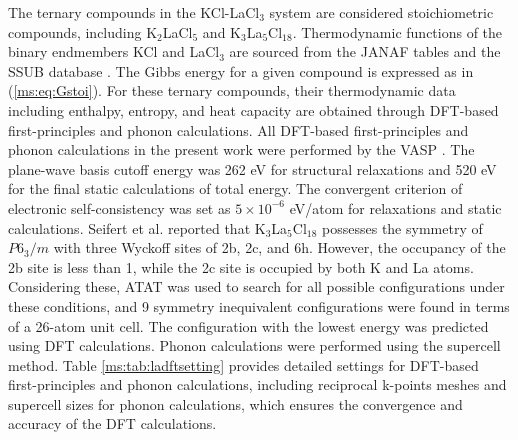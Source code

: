 The ternary compounds in the KCl-LaCl$_3$ system are considered stoichiometric compounds, including K$_2$LaCl$_5$ and K$_3$La$_5$Cl$_{18}$. Thermodynamic functions of the binary endmembers KCl and LaCl$_3$ are sourced from the JANAF tables \cite{chase1982janaf} and the SSUB database \cite{sgteurl}. The Gibbs energy for a given compound is expressed as in (\ref{ms:eq:Gstoi}). For these ternary compounds, their thermodynamic data including enthalpy, entropy, and heat capacity are obtained through DFT-based first-principles and phonon calculations. All DFT-based first-principles and phonon calculations in the present work were performed by the VASP \cite{kresse1996efficient}. The plane-wave basis cutoff energy was 262 eV for structural relaxations and 520 eV for the final static calculations of total energy. The convergent criterion of electronic self-consistency was set as $5\times10^{−6}$ eV/atom for relaxations and static calculations. Seifert et al. \cite{seifert1985thermodynamic} reported that K$_3$La$_5$Cl$_{18}$ possesses the symmetry of $P6_3/m$ with three Wyckoff sites of 2b, 2c, and 6h. However, the occupancy of the 2b site is less than 1, while the 2c site is occupied by both K and La atoms. Considering these, ATAT \cite{van2009multicomponent} was used to search for all possible configurations under these conditions, and 9 symmetry inequivalent configurations were found in terms of a 26-atom unit cell. The configuration with the lowest energy was predicted using DFT calculations. Phonon calculations were performed using the supercell method. Table \ref{ms:tab:ladftsetting} provides detailed settings for DFT-based first-principles and phonon calculations, including reciprocal k-points meshes and supercell sizes for phonon calculations, which ensures the convergence and accuracy of the DFT calculations.

